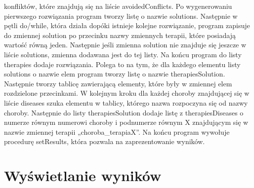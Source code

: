 \documentclass[oneside,a4paper]{book}
\begin{document}
\begin{spacing}{1.5}
konfliktów, które znajdują się na liście avoidedConflicts. Po wygenerowaniu pierwszego rozwiązania program tworzy listę o nazwie solutions. Następnie w pętli do/while, która działa dopóki istnieje kolejne rozwiązanie, program zapisuje do zmiennej solution po przecinku nazwy zmiennych terapii, które posiadają wartość równą jeden. Następnie jeśli zmienna solution nie znajduje się jeszcze w liście solutions, zmienna dodawana jest do tej listy. Na końcu program do listy therapies dodaje rozwiązania. Polega to na tym, że dla każdego elementu listy solutions o nazwie elem program tworzy listę o nazwie therapiesSolution. Następnie tworzy tablicę zawierającą elementy, które były w zmiennej elem rozdzielone przecinkami. W kolejnym kroku dla każdej choroby znajdującej się w liście diseases szuka elementu w tablicy, którego nazwa rozpoczyna się od nazwy choroby. Następnie do listy therapiesSolution dodaje listę z therapiesDiseases o numerze równym numerowi choroby i podnumerze równym X znajdującym się w nazwie zmiennej terapii „choroba\_terapiaX”. Na końcu program wywołuje procedurę setResults, która pozwala na zaprezentowanie wyników. 

\section{Wyświetlanie wyników}


\end{spacing}
\end{document}
